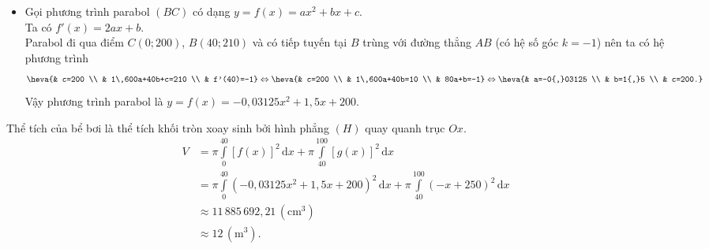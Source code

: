 \begin{ex}
{\begin{itemize}
			\item Gọi phương trình parabol $(BC)$ có dạng $y=f(x)=ax^2+bx+c$.\\
			Ta có $f'(x)=2ax+b$.\\
			Parabol đi qua điểm $C(0;200)$, $B(40;210)$ và có tiếp tuyến tại $B$ trùng với đường thẳng $AB$ (có hệ số góc $k=-1$) nên ta có hệ phương trình
			\[\heva{& c=200 \\ & 1\,600a+40b+c=210 \\ & f'(40)=-1} \Leftrightarrow \heva{& c=200 \\ & 1\,600a+40b=10 \\ & 80a+b=-1}
			\Leftrightarrow \heva{& a=-0{,}03125 \\ & b=1{,}5 \\ & c=200.} \]
			Vậy phương trình parabol là $y=f(x)=-0{,}03125x^2+1{,}5x+200$.
		\end{itemize}
		Thể tích của bể bơi là thể tích khối tròn xoay sinh bởi hình phẳng $(H)$ quay quanh trục $Ox$.
		\allowdisplaybreaks
		\begin{align*}
			V &= \pi \displaystyle\int\limits_{0}^{40} [f(x)]^2 \mathrm{\,d}x + \pi \displaystyle\int\limits_{40}^{100} [g(x)]^2 \mathrm{\,d}x \\
			&= \pi \displaystyle\int\limits_{0}^{40} \left(-0{,}03125x^2+1{,}5x+200\right)^2 \mathrm{\,d}x + \pi \displaystyle\int\limits_{40}^{100} (-x+250)^2 \mathrm{\,d}x \\
			&\approx 11\,885\,692{,}21\,\left(\text{cm}^3\right)\\
			&\approx 12 \,\left(\text{m}^3\right).
		\end{align*}
	}
\end{ex}

